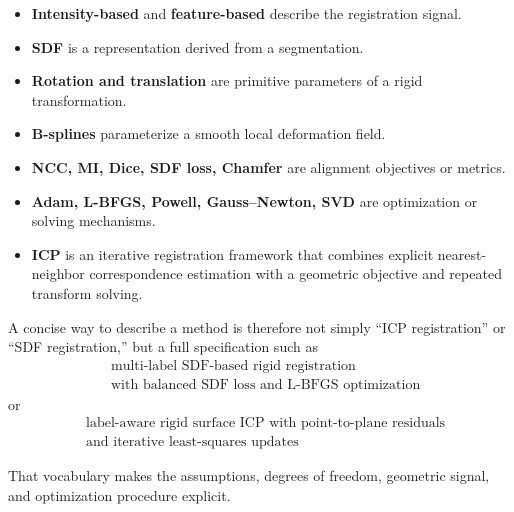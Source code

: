 \documentclass[11pt,a4paper]{article}
\begin{document}
\begin{itemize}
  \item \textbf{Intensity-based} and \textbf{feature-based} describe the registration signal.
  \item \textbf{SDF} is a representation derived from a segmentation.
  \item \textbf{Rotation and translation} are primitive parameters of a rigid transformation.
  \item \textbf{B-splines} parameterize a smooth local deformation field.
  \item \textbf{NCC, MI, Dice, SDF loss, Chamfer} are alignment objectives or metrics.
  \item \textbf{Adam, L-BFGS, Powell, Gauss--Newton, SVD} are optimization or solving mechanisms.
  \item \textbf{ICP} is an iterative registration framework that combines explicit nearest-neighbor correspondence estimation with a geometric objective and repeated transform solving.
\end{itemize}

A concise way to describe a method is therefore not simply ``ICP registration'' or ``SDF registration,'' but a full specification such as
\[
\boxed{
\begin{aligned}
&\text{multi-label SDF-based rigid registration}\\
&\text{with balanced SDF loss and L-BFGS optimization}
\end{aligned}
}
\]
or
\[
\boxed{
\begin{aligned}
&\text{label-aware rigid surface ICP with point-to-plane residuals}\\
&\text{and iterative least-squares updates}
\end{aligned}
}
\]

That vocabulary makes the assumptions, degrees of freedom, geometric signal, and optimization procedure explicit.
\end{document}
